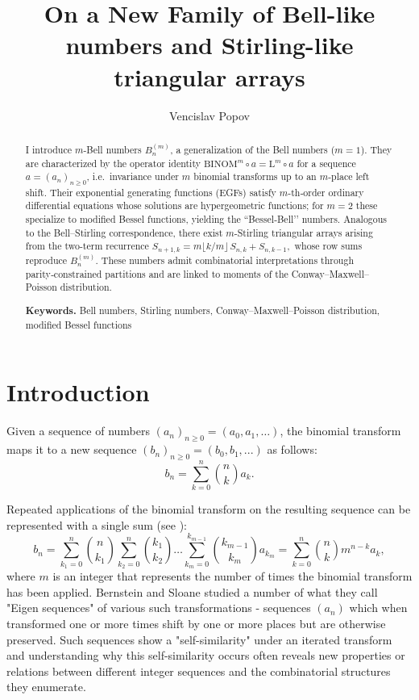 \documentclass[a4paper]{amsart}
\title[A generalization of the Bell and Stirling numbers]{On a New Family of Bell-like numbers and Stirling-like triangular arrays}
\author{Vencislav Popov}
\date{}
\begin{document}
\begin{abstract}
I introduce $m$-Bell numbers $B^{(m)}_{n}$, a generalization of the Bell numbers ($m=1$). They are characterized by the operator identity $\mathrm{BINOM}^{m}\!\circ a=\mathrm{L}^{m}\!\circ a$ for a sequence $a=(a_{n})_{n\ge0}$, i.e.\ invariance under $m$ binomial transforms up to an $m$-place left shift.  Their exponential generating functions (EGFs) satisfy $m$-th‑order ordinary differential equations whose solutions are hypergeometric functions; for $m=2$ these specialize to modified Bessel functions, yielding the “Bessel‑Bell’’ numbers. Analogous to the Bell–Stirling correspondence, there exist \(m\)-Stirling triangular arrays arising from the two‑term recurrence  $S_{n+1,k}=m\!\lfloor k/m\rfloor\,S_{n,k}+S_{n,k-1},$ whose row sums reproduce $B^{(m)}_{n}$. These numbers admit combinatorial interpretations through parity‑constrained partitions and are linked to moments of the Conway–Maxwell–Poisson distribution.

\bigskip
\noindent\textbf{Keywords.} Bell numbers, Stirling numbers, Conway–Maxwell–Poisson distribution, modified Bessel functions
\end{abstract}

\maketitle

\section{Introduction}\label{sec-introduction}
\noindent Given a sequence of numbers $(a_n)_{n \geq 0} = (a_0, a_1, \ldots)$, the binomial transform maps it to a new sequence $(b_n)_{n \geq 0} = (b_0,b_1,...)$ as follows:
\begin{equation*}
    b_n = \sum_{k=0}^{n} \binom{n}{k} a_k.
\end{equation*}

Repeated applications of the binomial transform on the resulting sequence can be represented with a single sum (see \cite{spiveyKbinomialTransformsHankel2006}):
\begin{equation*}
    b_n = \sum_{k_1=0}^{n} \binom{n}{k_1}\sum_{k_2=0}^{n} \binom{k_1}{k_2} \dots \sum_{k_{m}=0}^{k_{m-1}} \binom{k_{m-1}}{k_m} a_{k_m} = \sum_{k=0}^{n} \binom{n}{k} m^{n-k} a_k,
\end{equation*}
where $m$ is an integer that represents the number of times the binomial transform has been applied. Bernstein and Sloane \cite{bernstein1995} studied a number of what they call "Eigen sequences" of various such transformations - sequences $(a_n)$ which when transformed one or more times shift by one or more places but are otherwise preserved. Such sequences show a "self-similarity" under an iterated transform and understanding why this self-similarity occurs often reveals new properties or relations between different integer sequences and the combinatorial structures they enumerate.
\end{document}
